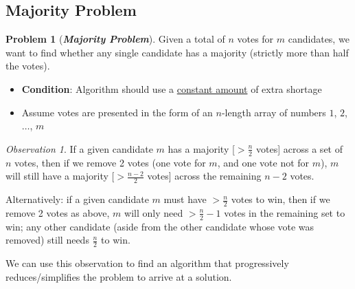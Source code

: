 \documentclass[12pt]{extarticle}
\theoremstyle{definition}
\newtheorem*{problem}{Problem}
\theoremstyle{remark}
\newtheorem*{observation}{Observation}
\newcommand{\probname}[1]{\noindent \textbf{\textit{#1}}}
\begin{document}
\subsection{Majority Problem}
\begin{problem}[\probname{Majority Problem}] Given a total of $n$ votes for $m$ candidates, we want to find whether any single candidate has a majority (strictly more than half the votes). \begin{itemize}
    \item \textbf{Condition}: Algorithm should use a \ul{constant amount} of extra shortage
    \item Assume votes are presented in the form of an $n$-length array of numbers $1$, $2$, $\hdots$, $m$
\end{itemize}
\end{problem}

\begin{observation}
    If a given candidate $m$ has a majority [$>\frac{n}{2}$ votes] across a set of $n$ votes, then if we remove 2 votes (one vote for $m$, and one vote not for $m$), $m$ will still have a majority [$>\frac{n-2}{2}$ votes] across the remaining $n-2$ votes.

    Alternatively: if a given candidate $m$ must have $>\frac{n}{2}$ votes to win, then if we remove 2 votes as above, $m$ will only need $>\frac{n}{2}-1$ votes in the remaining set to win; any other candidate (aside from the other candidate whose vote was removed) still needs $\frac{n}{2}$ to win.
\end{observation}

\vspace{6pt}
We can use this observation to find an algorithm that progressively reduces/simplifies the problem to arrive at a solution.
\end{document}
